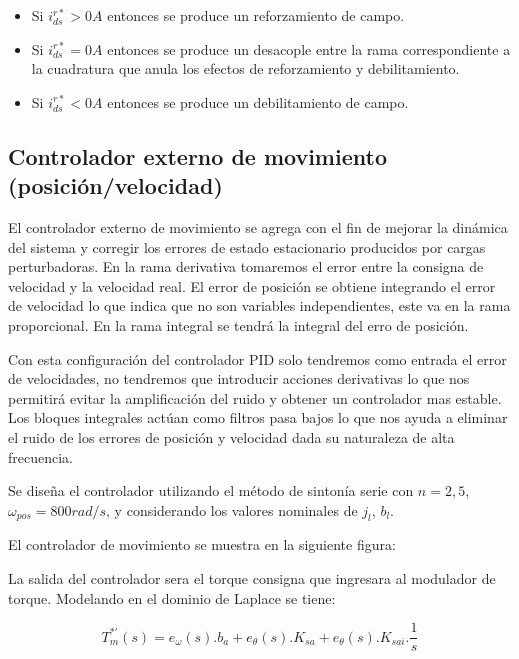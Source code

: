 \documentclass{article}
\begin{document}
\begin{itemize}
    \item Si $i_{ds}^{r*} > 0 A$ entonces se produce un reforzamiento de campo.
    \item Si $i_{ds}^{r*} = 0 A$ entonces se produce un desacople entre la rama correspondiente a 
    la cuadratura que anula los efectos de reforzamiento y debilitamiento.
    \item Si $i_{ds}^{r*} < 0 A$ entonces se produce un debilitamiento de campo.
\end{itemize}


\subsection{Controlador externo de movimiento (posición/velocidad)}

El controlador externo de movimiento se agrega con el fin de mejorar la dinámica del sistema y corregir los
errores de estado estacionario producidos por cargas perturbadoras. En la rama derivativa tomaremos el 
error entre la consigna de velocidad y la velocidad real. El error de posición se obtiene integrando el 
error de velocidad lo que indica que no son variables independientes, este va en la rama proporcional.
En la rama integral se tendrá la integral del erro de posición. 

Con esta configuración del controlador PID solo tendremos como entrada el error de velocidades, no tendremos
que introducir acciones derivativas lo que nos permitirá evitar la amplificación del ruido y obtener un 
controlador mas estable. Los bloques integrales actúan como filtros pasa bajos lo que nos ayuda a eliminar
el ruido de los errores de posición y velocidad dada su naturaleza de alta frecuencia.

Se diseña el controlador utilizando el método de sintonía serie con $n = 2,5$, $\omega_{pos} = 800 rad/s$, y
considerando los valores nominales de $j_l$, $b_l$. 

El controlador de movimiento se muestra en la siguiente figura: 


La salida del controlador sera el torque consigna que ingresara al modulador de torque. Modelando en el 
dominio de Laplace se tiene:

\begin{equation}\label{eq.controlador_error}
    T_m^{*\prime}(s) = e_\omega(s).b_a + e_\theta(s).K_{sa} + e_\theta(s).K_{sai}.\frac{1}{s}
\end{equation}
\end{document}
